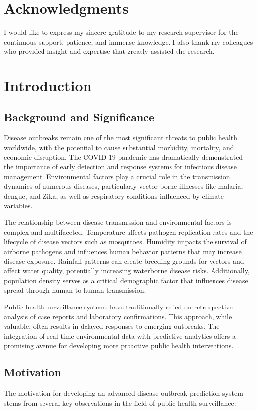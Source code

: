\documentclass[12pt,a4paper]{report}
\begin{document}
\chapter*{Acknowledgments}
I would like to express my sincere gratitude to my research supervisor for the continuous support, patience, and immense knowledge. I also thank my colleagues who provided insight and expertise that greatly assisted the research.

\chapter{Introduction}
\section{Background and Significance}
Disease outbreaks remain one of the most significant threats to public health worldwide, with the potential to cause substantial morbidity, mortality, and economic disruption. The COVID-19 pandemic has dramatically demonstrated the importance of early detection and response systems for infectious disease management. Environmental factors play a crucial role in the transmission dynamics of numerous diseases, particularly vector-borne illnesses like malaria, dengue, and Zika, as well as respiratory conditions influenced by climate variables.

The relationship between disease transmission and environmental factors is complex and multifaceted. Temperature affects pathogen replication rates and the lifecycle of disease vectors such as mosquitoes. Humidity impacts the survival of airborne pathogens and influences human behavior patterns that may increase disease exposure. Rainfall patterns can create breeding grounds for vectors and affect water quality, potentially increasing waterborne disease risks. Additionally, population density serves as a critical demographic factor that influences disease spread through human-to-human transmission.

Public health surveillance systems have traditionally relied on retrospective analysis of case reports and laboratory confirmations. This approach, while valuable, often results in delayed responses to emerging outbreaks. The integration of real-time environmental data with predictive analytics offers a promising avenue for developing more proactive public health interventions.

\section{Motivation}
The motivation for developing an advanced disease outbreak prediction system stems from several key observations in the field of public health surveillance:
\end{document}
